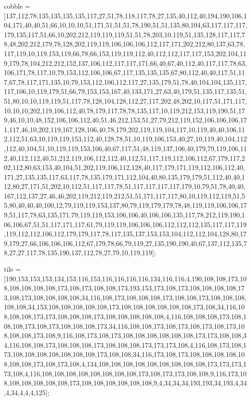 cobble = [137,112,78,135,135,135,135,117,27,51,78,118,117,78,27,135,40,112,40,194,190,106,104,171,40,40,51,66,10,10,10,51,171,51,51,51,78,190,51,51,135,80,104,63,117,117,117,179,135,117,51,66,10,202,212,119,119,119,51,51,78,203,10,119,51,135,128,117,117,78,48,202,212,179,78,128,202,119,119,106,106,106,112,117,171,202,212,80,137,63,78,117,119,10,119,153,119,66,78,66,153,119,119,112,40,112,112,117,117,153,202,104,119,179,78,104,212,212,152,137,106,112,117,117,171,66,40,67,40,112,40,117,117,78,63,106,171,78,117,10,79,153,112,106,106,67,117,135,135,135,67,80,112,40,40,117,51,117,67,78,117,171,135,10,79,153,112,106,112,117,27,135,179,51,78,40,104,104,135,117,117,106,10,119,179,51,66,79,153,153,167,40,133,171,27,63,40,179,51,135,117,135,51,51,80,10,10,119,119,51,117,78,128,104,128,112,27,117,202,48,202,10,117,51,171,117,10,10,10,202,119,106,112,40,78,179,117,78,78,135,117,10,119,212,153,119,190,51,179,46,10,10,48,152,106,106,112,40,51,46,212,153,51,27,79,212,119,152,106,106,106,171,117,46,10,202,119,167,128,106,40,78,179,202,119,119,104,117,10,119,40,40,106,112,112,51,63,10,119,119,153,112,40,128,78,51,10,119,106,153,40,27,10,119,40,104,112,112,40,104,51,10,119,119,153,106,40,67,117,51,48,119,137,106,40,179,79,119,106,112,40,112,112,40,51,212,119,106,112,112,40,112,51,117,119,112,106,112,67,179,117,202,112,80,63,153,40,104,51,202,119,106,112,128,40,117,179,171,119,112,106,112,40,171,27,135,135,117,63,117,78,135,179,171,112,104,40,80,135,179,179,51,112,40,40,112,80,27,171,51,202,10,112,51,117,117,78,51,117,117,117,117,179,10,79,51,78,40,40,167,112,137,27,46,46,202,119,212,119,212,51,51,171,117,117,80,10,119,112,119,51,55,80,40,40,40,100,12,79,119,119,153,137,80,79,119,179,179,78,48,119,119,106,106,179,51,117,78,63,135,171,79,119,119,153,106,106,40,106,106,135,117,78,212,119,190,106,106,67,51,51,117,171,117,61,79,119,119,106,106,106,112,112,112,135,117,117,119,119,112,112,106,112,179,179,117,78,117,135,137,153,153,104,112,112,104,128,80,179,179,27,66,106,106,106,112,67,179,78,66,79,119,27,135,190,190,40,67,137,112,135,78,27,27,117,78,135,190,137,112,78,27,79,10,119,119];

tile = [190,153,153,153,134,153,116,153,116,116,116,116,134,116,116,4,190,108,108,173,108,108,108,108,108,173,108,173,108,108,173,193,153,173,108,173,108,108,108,108,173,108,173,108,108,108,108,34,116,108,173,108,108,108,173,108,108,173,108,108,108,108,108,34,153,108,108,108,108,108,173,108,108,108,108,108,108,173,108,34,116,108,108,108,173,173,108,108,108,173,108,108,108,108,108,4,116,108,108,108,173,108,108,108,173,108,173,108,108,108,173,34,116,108,108,173,108,173,108,173,108,173,108,108,108,173,108,9,116,108,173,108,173,108,108,108,108,108,108,173,173,108,108,34,116,108,108,173,108,108,108,173,108,108,108,173,173,173,108,4,116,108,173,108,173,108,108,108,108,108,108,108,173,108,108,34,116,173,108,173,108,108,108,108,108,108,108,173,108,173,108,4,134,108,108,108,108,108,108,108,108,108,173,173,173,173,108,4,116,108,108,108,108,108,108,108,108,173,108,173,173,108,108,9,116,173,108,108,108,108,108,108,173,108,108,108,108,108,108,9,4,34,34,34,193,193,34,193,4,34,4,34,4,4,4,125];

